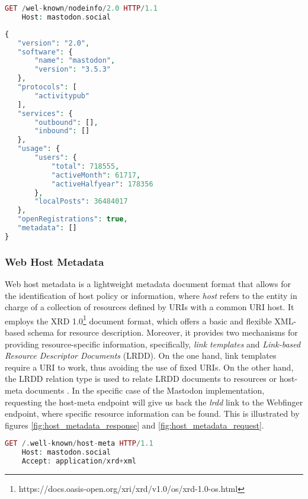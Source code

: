 \lstset{style=JSONStyle}
\begin{lstlisting}[language=PHP, caption=NodeInfo request]
    GET /wel-known/nodeinfo/2.0 HTTP/1.1
    Host: mastodon.social
\end{lstlisting}

\lstset{style=JSONStyle}
\begin{lstlisting}[language=PHP, caption=NodeInfo response for mastodon.social, label=NodeInfo response for mastodon.social, float=H]
{
   "version": "2.0",
   "software": {
       "name": "mastodon",
       "version": "3.5.3"
   },
   "protocols": [
       "activitypub"
   ],
   "services": {
       "outbound": [],
       "inbound": []
   },
   "usage": {
       "users": {
           "total": 718555,
           "activeMonth": 61717,
           "activeHalfyear": 178356
       },
       "localPosts": 36484017
   },
   "openRegistrations": true,
   "metadata": []
}
\end{lstlisting}


\subsubsection{Web Host Metadata}
    Web host metadata is a lightweight metadata document format that allows for the identification of host policy or information, where \emph{host} refers to the entity in charge of a collection of resources defined by URIs with a common URI host. It employs the XRD 1.0\footnote{https://docs.oasis-open.org/xri/xrd/v1.0/os/xrd-1.0-os.html} document format, which offers a basic and flexible XML-based schema for resource description. Moreover, it provides two mechanisms for providing resource-specific information, specifically,  \emph{link templates} and \emph{Link-based Resource Descriptor Documents} (LRDD). On the one hand, link templates require a URI to work, thus avoiding the use of fixed URIs. On the other hand, the LRDD relation type is used to relate LRDD documents to resources or host-meta documents \cite{cook_2011}. In the specific case of the Mastodon implementation, requesting the host-meta endpoint will give us back the \emph{lrdd} link to the Webfinger endpoint, where specific resource information can be found. This is illustrated by figures \ref{fig:host_metadata_response} and \ref{fig:host_metadata_request}.

\lstset{style=JSONStyle}
\begin{lstlisting}[language=PHP, caption=Example Host Metadata request to mastodon.social, label=fig:host_metadata_request]
    GET /.well-known/host-meta HTTP/1.1
    Host: mastodon.social
    Accept: application/xrd+xml
\end{lstlisting}

